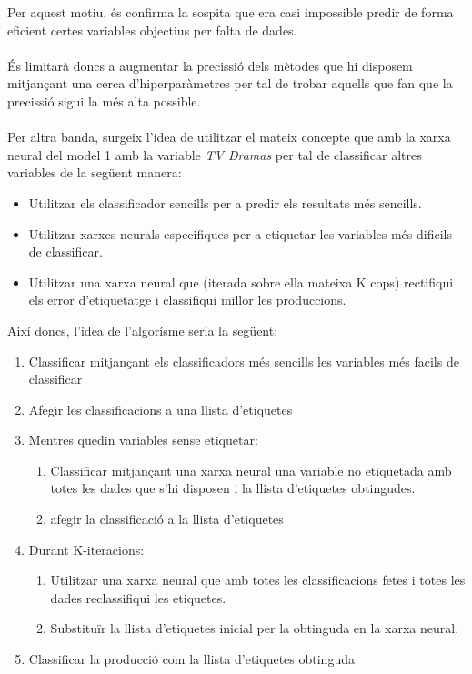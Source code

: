 \documentclass[a4paper, 11pt]{article}
\begin{document}
Per aquest motiu, és confirma la sospita que era casi impossible predir de forma eficient certes variables objectius per falta de dades.\\\\
És limitarà doncs a augmentar la precissió dels mètodes que hi disposem mitjançant una cerca d'hiperparàmetres per tal de trobar aquells que fan que la precissió sigui la més alta possible.\\\\
Per altra banda, surgeix l'idea de utilitzar el mateix concepte que amb la xarxa neural del model 1 amb la variable \textit{TV Dramas} per tal de classificar altres variables de la següent manera:
\begin{itemize}
    \item Utilitzar els classificador sencills per a predir els resultats més sencills.
    \item Utilitzar xarxes neurals especifiques per a etiquetar les variables més dificils de classificar.
    \item Utilitzar una xarxa neural que (iterada sobre ella mateixa K cops) rectifiqui els error d'etiquetatge i classifiqui millor les produccions.
\end{itemize}
\newpage 
Així doncs, l'idea de l'algorísme seria la següent:
\begin{enumerate}
    \item Classificar mitjançant els classificadors més sencills les variables més facils de classificar
    \item Afegir les classificacions a una llista d'etiquetes
    \item Mentres quedin variables sense etiquetar:
    \begin{enumerate}
        \item Classificar mitjançant una xarxa neural una variable no etiquetada amb totes les dades que s'hi disposen i la llista d'etiquetes obtingudes.
        \item afegir la classificació a la llista d'etiquetes
    \end{enumerate}
    \item Durant K-iteracions:
    \begin{enumerate}
        \item Utilitzar una xarxa neural que amb totes les classificacions fetes i totes les dades reclassifiqui les etiquetes. 
        \item Substituïr la llista d'etiquetes inicial per la obtinguda en la xarxa neural.
    \end{enumerate}
    \item Classificar la producció com la llista d'etiquetes obtinguda
\end{enumerate}
\end{document}
